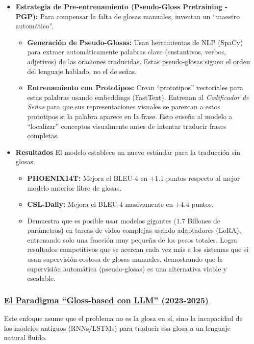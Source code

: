 \documentclass[11pt,a4paper]{article}
\begin{document}
\begin{itemize}
\begin{itemize}
\begin{itemize}
		\end{itemize}
	\end{itemize}
		\item \textbf{Estrategia de Pre-entrenamiento (Pseudo-Gloss Pretraining - PGP):} Para compensar la falta de glosas manuales, inventan un ``maestro automático''.
		\begin{itemize}
			\item \textbf{Generación de Pseudo-Glosas:} Usan herramientas de NLP (SpaCy) para extraer automáticamente palabras clave (sustantivos, verbos, adjetivos) de las oraciones traducidas. Estas pseudo-glosas siguen el orden del lenguaje hablado, no el de señas.
			\item \textbf{Entrenamiento con Prototipos:} Crean ``prototipos'' vectoriales para estas palabras usando embeddings (FastText). Entrenan al \emph{Codificador de Señas} para que sus representaciones visuales se parezcan a estos prototipos si la palabra aparece en la frase. Esto enseña al modelo a ``localizar'' conceptos visualmente antes de intentar traducir frases completas.
		\end{itemize}
	\item \textbf{Resultados} El modelo establece un nuevo estándar para la traducción sin glosas.
	\begin{itemize}
		\item \textbf{PHOENIX14T:} Mejora el BLEU-4 en $+1.1$ puntos respecto al mejor modelo anterior libre de glosas.
		\item\textbf{ CSL-Daily:} Mejora el BLEU-4 masivamente en $+4.4$ puntos.
		
		\item Demuestra que es posible usar modelos gigantes ($1.7$ Billones de parámetros) en tareas de video complejas usando adaptadores (LoRA), entrenando solo una fracción muy pequeña de los pesos totales. Logra resultados competitivos que se acercan cada vez más a los sistemas que sí usan supervisión costosa de glosas manuales, demostrando que la supervisión automática (pseudo-glosas) es una alternativa viable y escalable.
	\end{itemize}
		
\end{itemize}

\subsubsection{\underline{El Paradigma ``Gloss-based con LLM'' (2023-2025)}}
Este enfoque asume que el problema no es la glosa en sí, sino la incapacidad de los modelos antiguos (RNNs/LSTMs) para traducir esa glosa a un lenguaje natural fluido.
\end{document}
